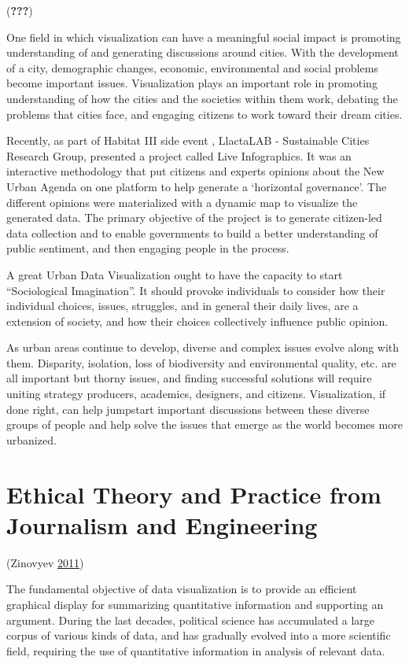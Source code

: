 \documentclass[]{book}
\begin{document}
({\textbf{???}})

One field in which visualization can have a meaningful social impact is
promoting understanding of and generating discussions around cities.
With the development of a city, demographic changes, economic,
environmental and social problems become important issues. Visualization
plays an important role in promoting understanding of how the cities and
the societies within them work, debating the problems that cities face,
and engaging citizens to work toward their dream cities.

Recently, as part of Habitat III side event , LlactaLAB - Sustainable
Cities Research Group, presented a project called Live Infographics. It
was an interactive methodology that put citizens and experts opinions
about the New Urban Agenda on one platform to help generate a
`horizontal governance'. The different opinions were materialized with a
dynamic map to visualize the generated data. The primary objective of
the project is to generate citizen-led data collection and to enable
governments to build a better understanding of public sentiment, and
then engaging people in the process.

A great Urban Data Visualization ought to have the capacity to start
``Sociological Imagination''. It should provoke individuals to consider
how their individual choices, issues, struggles, and in general their
daily lives, are a extension of society, and how their choices
collectively influence public opinion.

As urban areas continue to develop, diverse and complex issues evolve
along with them. Disparity, isolation, loss of biodiversity and
environmental quality, etc. are all important but thorny issues, and
finding successful solutions will require uniting strategy producers,
academics, designers, and citizens. Visualization, if done right, can
help jumpstart important discussions between these diverse groups of
people and help solve the issues that emerge as the world becomes more
urbanized.

\section{Ethical Theory and Practice from Journalism and
Engineering}\label{ethical-theory-and-practice-from-journalism-and-engineering}

(Zinovyev \protect\hyperlink{ref-poli_social_science}{2011})

The fundamental objective of data visualization is to provide an
efficient graphical display for summarizing quantitative information and
supporting an argument. During the last decades, political science has
accumulated a large corpus of various kinds of data, and has gradually
evolved into a more scientific field, requiring the use of quantitative
information in analysis of relevant data.
\end{document}
